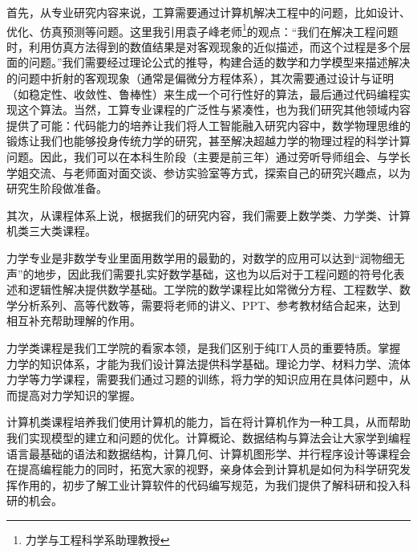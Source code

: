 \vspace{10pt}

首先，从专业研究内容来说，工算需要通过计算机解决工程中的问题，比如设计、优化、仿真预测等问题。这里我引用袁子峰老师\footnote{力学与工程科学系助理教授}的观点：“我们在解决工程问题时，利用仿真方法得到的数值结果是对客观现象的近似描述，而这个过程是多个层面的问题。”我们需要经过理论公式的推导，构建合适的数学和力学模型来描述解决的问题中折射的客观现象（通常是偏微分方程体系），其次需要通过设计与证明（如稳定性、收敛性、鲁棒性）来生成一个可行性好的算法，最后通过代码编程实现这个算法。当然，工算专业课程的广泛性与紧凑性，也为我们研究其他领域内容提供了可能：代码能力的培养让我们将人工智能融入研究内容中，数学物理思维的锻炼让我们也能够投身传统力学的研究，甚至解决超越力学的物理过程的科学计算问题。因此，我们可以在本科生阶段（主要是前三年）通过旁听导师组会、与学长学姐交流、与老师面对面交谈、参访实验室等方式，探索自己的研究兴趣点，以为研究生阶段做准备。

\vspace{10pt}

其次，从课程体系上说，根据我们的研究内容，我们需要上数学类、力学类、计算机类三大类课程。

\vspace{10pt}

力学专业是非数学专业里面用数学用的最勤的，对数学的应用可以达到“润物细无声”的地步，因此我们需要扎实好数学基础，这也为以后对于工程问题的符号化表述和逻辑性解决提供数学基础。工学院的数学课程比如常微分方程、工程数学、数学分析系列、高等代数等，需要将老师的讲义、PPT、参考教材结合起来，达到相互补充帮助理解的作用。

\vspace{10pt}

力学类课程是我们工学院的看家本领，是我们区别于纯IT人员的重要特质。掌握力学的知识体系，才能为我们设计算法提供科学基础。理论力学、材料力学、流体力学等力学课程，需要我们通过习题的训练，将力学的知识应用在具体问题中，从而提高对力学知识的掌握。

\vspace{10pt}

计算机类课程培养我们使用计算机的能力，旨在将计算机作为一种工具，从而帮助我们实现模型的建立和问题的优化。计算概论、数据结构与算法会让大家学到编程语言最基础的语法和数据结构，计算几何、计算机图形学、并行程序设计等课程会在提高编程能力的同时，拓宽大家的视野，亲身体会到计算机是如何为科学研究发挥作用的，初步了解工业计算软件的代码编写规范，为我们提供了解科研和投入科研的机会。

\vspace{10pt}

